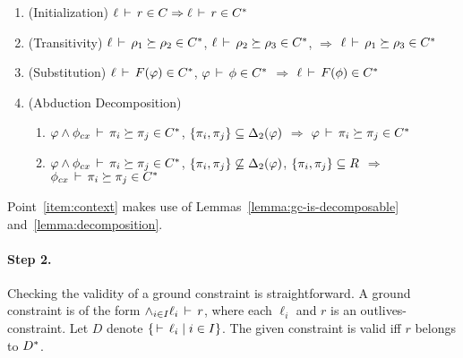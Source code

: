 \begin{enumerate}

\item (Initialization) $\ell\,\vdash\,r \in C \Rightarrow \ell\,\vdash\,r \in {C}^*$

\item (Transitivity)
  \label{item:transitivity}
$\ell\,\vdash\,\rho_1 \succeq \rho_2 \in {C}^*$,
$\ell\,\vdash\,\rho_2 \succeq \rho_3 \in {C}^*$,
$\Rightarrow$
$\ell\,\vdash\,\rho_1 \succeq \rho_3 \in {C}^*$

\item (Substitution)
  \label{item:subst}
$\ell\,\vdash\,F(\varphi) \in {C}^*$,
$\varphi\,\vdash\,\phi \in {C}^*$
$\Rightarrow$ $\ell\,\vdash\,F(\phi) \in {C}^*$

\item (Abduction Decomposition)
\label{item:context}
\begin{enumerate}
\item
$\varphi \wedge \phi_{cx}\,\vdash\,\pi_i \succeq \pi_j \in {C}^*$,
$\{ \pi_i, \pi_j \} \subseteq {\Delta_2}(\varphi)$
$\Rightarrow$
$\varphi\,\vdash\,\pi_i \succeq \pi_j \in {C}^* $

\item 
$\varphi \wedge \phi_{cx}\,\vdash\,\pi_i \succeq \pi_j \in {C}^*$,
$\{ \pi_i, \pi_j \} \not\subseteq {\Delta_2}(\varphi)$,
$\{ \pi_i, \pi_j \} \subseteq R$
$\Rightarrow$
$\phi_{cx}\,\vdash\,\pi_i \succeq \pi_j \in {C}^* $
\end{enumerate}

\end{enumerate}

Point~\ref{item:context} makes use of Lemmas~\ref{lemma:gc-is-decomposable} and~\ref{lemma:decomposition}.

\paragraph{Step 2.}
Checking the validity of a ground constraint is straightforward.
A ground constraint is of the form $\wedge_{i \in I} \ell_i\,\vdash\,r$, where each
$\ell_i$ and $r$ is an outlives-constraint.
Let $D$ denote $\{ \,\vdash\,\ell_i \;|\; i \in I \}$.
The given constraint is valid iff $r$ belongs to ${D}^*$.

